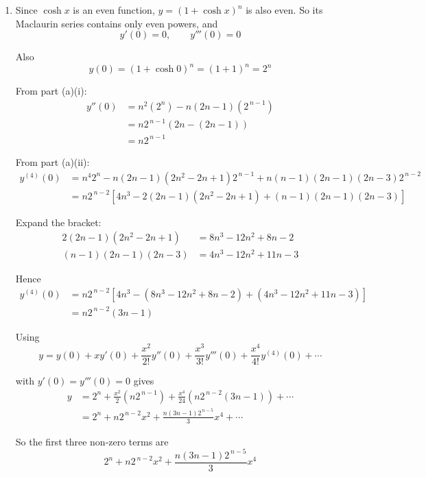 \documentclass[leqno]{article}
\begin{document}
\begin{enumerate}[
  label=\textbf{\arabic*.},
  leftmargin=*,
  topsep=0pt,
  partopsep=0pt,
  parsep=0pt
]
\begin{djsSolution}
\begin{enumerate}[label=\textbf{(\alph*)}]
\begin{enumerate}[label=(\roman*)]
    Since
    \[
    n^2+(n-1)^2=2n^2-2n+1
    \]

    we get
    \[
    \frac{\mathrm{d}^4 y}{\mathrm{d}x^4}
    =n^4(1+\cosh x)^n-n(2n-1)(2n^2-2n+1)(1+\cosh x)^{n-1}
    +n(n-1)(2n-1)(2n-3)(1+\cosh x)^{n-2}
    \]
  \end{enumerate}

  \item Since $\cosh x$ is an even function, $y=(1+\cosh x)^n$ is also even. So its Maclaurin series contains only even powers, and
  \[
  y'(0)=0,\qquad y'''(0)=0
  \]

  Also
  \[
  y(0)=(1+\cosh 0)^n=(1+1)^n=2^n
  \]

  From part (a)(i):
  \begin{align*}
  y''(0)
  &=n^2(2^n)-n(2n-1)(2^{\,n-1}) \\
  &=n2^{\,n-1}\left(2n-(2n-1)\right) \\
  &=n2^{\,n-1}
  \end{align*}

  From part (a)(ii):
  \begin{align*}
  y^{(4)}(0)
  &=n^4 2^n-n(2n-1)(2n^2-2n+1)2^{\,n-1}+n(n-1)(2n-1)(2n-3)2^{\,n-2} \\
  &=n2^{\,n-2}\left[4n^3-2(2n-1)(2n^2-2n+1)+(n-1)(2n-1)(2n-3)\right]
  \end{align*}

  Expand the bracket:
  \begin{align*}
  2(2n-1)(2n^2-2n+1)&=8n^3-12n^2+8n-2 \\
  (n-1)(2n-1)(2n-3)&=4n^3-12n^2+11n-3
  \end{align*}

  Hence
  \begin{align*}
  y^{(4)}(0)
  &=n2^{\,n-2}\left[4n^3-(8n^3-12n^2+8n-2)+(4n^3-12n^2+11n-3)\right] \\
  &=n2^{\,n-2}(3n-1)
  \end{align*}

  Using
  \[
  y=y(0)+xy'(0)+\frac{x^2}{2!}y''(0)+\frac{x^3}{3!}y'''(0)+\frac{x^4}{4!}y^{(4)}(0)+\cdots
  \]

  with $y'(0)=y'''(0)=0$ gives
  \begin{align*}
  y
  &=2^n+\frac{x^2}{2}\left(n2^{\,n-1}\right)+\frac{x^4}{24}\left(n2^{\,n-2}(3n-1)\right)+\cdots \\
  &=2^n+n2^{\,n-2}x^2+\frac{n(3n-1)2^{\,n-5}}{3}x^4+\cdots
  \end{align*}

  So the first three non-zero terms are
  \[
  2^n+n2^{\,n-2}x^2+\frac{n(3n-1)2^{\,n-5}}{3}x^4
  \]
\end{enumerate}
\end{djsSolution}


\end{enumerate}
\end{document}
